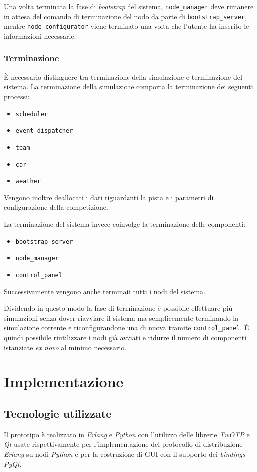 \documentclass[a4paper]{report}
\newcommand{\Erlang}{\textsl{Erlang}}
\newcommand{\Python}{\textsl{Python}}
\begin{document}
Una volta terminata la fase di \textit{bootstrap} del sistema, \texttt{node\_manager} deve rimanere in attesa del comando di terminazione del nodo da parte di \texttt{bootstrap\_server}, mentre \texttt{node\_configurator} viene terminato una volta che l'utente ha inserito le informazioni necessarie.

\subsection*{Terminazione}
\`E necessario distinguere tra terminazione della simulazione e terminazione del sistema.
La terminazione della simulazione comporta la terminazione dei seguenti processi:
\begin{itemize}
\item \texttt{scheduler}
\item \texttt{event\_dispatcher}
\item \texttt{team}
\item \texttt{car}
\item \texttt{weather}
\end{itemize}
Vengono inoltre deallocati i dati riguardanti la pista e i parametri di configurazione della competizione.

La terminazione del sistema invece coinvolge la terminazione delle componenti:
\begin{itemize}
\item \texttt{bootstrap\_server}
\item \texttt{node\_manager}
\item \texttt{control\_panel}
\end{itemize}
Successivamente vengono anche terminati tutti i nodi del sistema.

Dividendo in questo modo la fase di terminazione è possibile effettuare più simulazioni senza dover riavviare il sistema ma semplicemente terminando la simulazione corrente e riconfigurandone una di nuova tramite \texttt{control\_panel}. \`E quindi possibile riutilizzare i nodi già avviati e ridurre il numero di componenti istanziate \textit{ex novo} al minimo necessario.


\chapter{Implementazione}
\section{Tecnologie utilizzate}
Il prototipo è realizzato in \Erlang{} e \Python{} con l'utilizzo delle librerie \textsl{TwOTP} e \textsl{Qt} usate rispettivamente per l'implementazione del protocollo di distribuzione \Erlang{} su nodi \Python{} e per la costruzione di GUI con il supporto dei \textit{bindings} \textsl{PyQt}.
\end{document}
